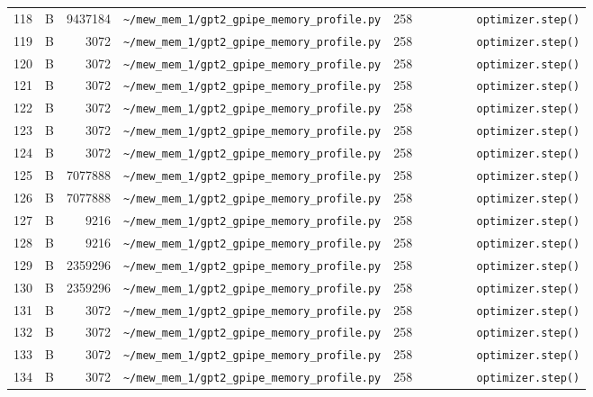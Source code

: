 \documentclass{article}
\begin{document}
\begin{longtable}{r l r p{6.5cm} r p{7.0cm}}
118 & B & 9437184 & \lstinline|~/mew_mem_1/gpt2_gpipe_memory_profile.py| & 258 & \lstinline|        optimizer.step()| \\
119 & B & 3072 & \lstinline|~/mew_mem_1/gpt2_gpipe_memory_profile.py| & 258 & \lstinline|        optimizer.step()| \\
120 & B & 3072 & \lstinline|~/mew_mem_1/gpt2_gpipe_memory_profile.py| & 258 & \lstinline|        optimizer.step()| \\
121 & B & 3072 & \lstinline|~/mew_mem_1/gpt2_gpipe_memory_profile.py| & 258 & \lstinline|        optimizer.step()| \\
122 & B & 3072 & \lstinline|~/mew_mem_1/gpt2_gpipe_memory_profile.py| & 258 & \lstinline|        optimizer.step()| \\
123 & B & 3072 & \lstinline|~/mew_mem_1/gpt2_gpipe_memory_profile.py| & 258 & \lstinline|        optimizer.step()| \\
124 & B & 3072 & \lstinline|~/mew_mem_1/gpt2_gpipe_memory_profile.py| & 258 & \lstinline|        optimizer.step()| \\
125 & B & 7077888 & \lstinline|~/mew_mem_1/gpt2_gpipe_memory_profile.py| & 258 & \lstinline|        optimizer.step()| \\
126 & B & 7077888 & \lstinline|~/mew_mem_1/gpt2_gpipe_memory_profile.py| & 258 & \lstinline|        optimizer.step()| \\
127 & B & 9216 & \lstinline|~/mew_mem_1/gpt2_gpipe_memory_profile.py| & 258 & \lstinline|        optimizer.step()| \\
128 & B & 9216 & \lstinline|~/mew_mem_1/gpt2_gpipe_memory_profile.py| & 258 & \lstinline|        optimizer.step()| \\
129 & B & 2359296 & \lstinline|~/mew_mem_1/gpt2_gpipe_memory_profile.py| & 258 & \lstinline|        optimizer.step()| \\
130 & B & 2359296 & \lstinline|~/mew_mem_1/gpt2_gpipe_memory_profile.py| & 258 & \lstinline|        optimizer.step()| \\
131 & B & 3072 & \lstinline|~/mew_mem_1/gpt2_gpipe_memory_profile.py| & 258 & \lstinline|        optimizer.step()| \\
132 & B & 3072 & \lstinline|~/mew_mem_1/gpt2_gpipe_memory_profile.py| & 258 & \lstinline|        optimizer.step()| \\
133 & B & 3072 & \lstinline|~/mew_mem_1/gpt2_gpipe_memory_profile.py| & 258 & \lstinline|        optimizer.step()| \\
134 & B & 3072 & \lstinline|~/mew_mem_1/gpt2_gpipe_memory_profile.py| & 258 & \lstinline|        optimizer.step()| \\

\end{longtable}
\end{document}
